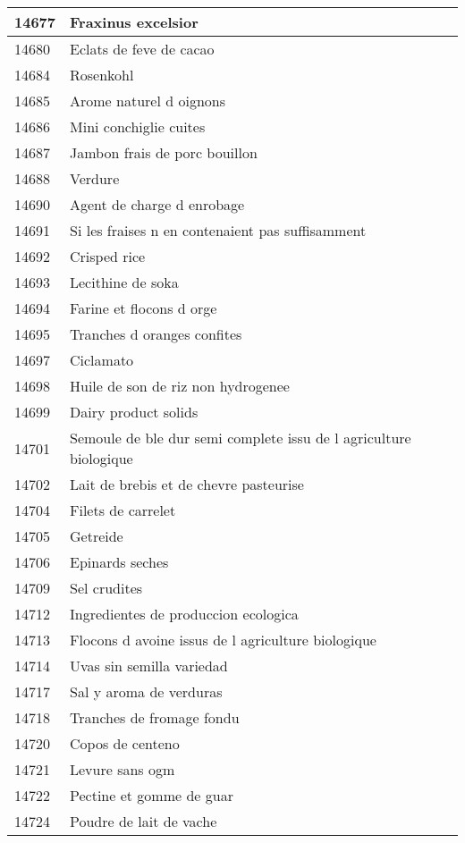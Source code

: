 \begin{longtable}{|l|l|}
14677 & Fraxinus excelsior \\ \hline 
14680 & Eclats de feve de cacao \\ \hline 
14684 & Rosenkohl \\ \hline 
14685 & Arome naturel d oignons \\ \hline 
14686 & Mini conchiglie cuites \\ \hline 
14687 & Jambon frais de porc bouillon \\ \hline 
14688 & Verdure \\ \hline 
14690 & Agent de charge d enrobage \\ \hline 
14691 & Si les fraises n en contenaient pas suffisamment \\ \hline 
14692 & Crisped rice \\ \hline 
14693 & Lecithine de soka \\ \hline 
14694 & Farine et flocons d orge \\ \hline 
14695 & Tranches d oranges confites \\ \hline 
14697 & Ciclamato \\ \hline 
14698 & Huile de son de riz non hydrogenee \\ \hline 
14699 & Dairy product solids \\ \hline 
14701 & Semoule de ble dur semi complete issu de l agriculture biologique \\ \hline 
14702 & Lait de brebis et de chevre pasteurise \\ \hline 
14704 & Filets de carrelet \\ \hline 
14705 & Getreide \\ \hline 
14706 & Epinards seches \\ \hline 
14709 & Sel crudites \\ \hline 
14712 & Ingredientes de produccion ecologica \\ \hline 
14713 & Flocons d avoine issus de l agriculture biologique \\ \hline 
14714 & Uvas sin semilla variedad \\ \hline 
14717 & Sal y aroma de verduras \\ \hline 
14718 & Tranches de fromage fondu \\ \hline 
14720 & Copos de centeno \\ \hline 
14721 & Levure sans ogm \\ \hline 
14722 & Pectine et gomme de guar \\ \hline 
14724 & Poudre de lait de vache \\ \hline 

\end{longtable}

